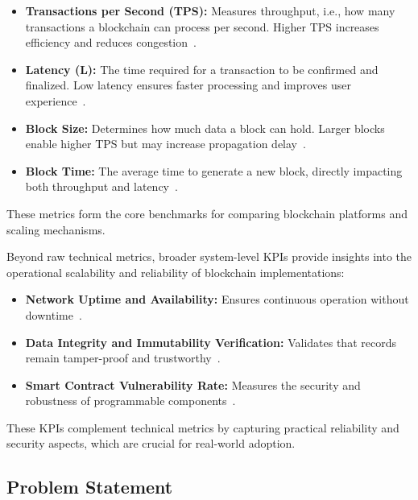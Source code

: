\begin{itemize}
    \item \textbf{Transactions per Second (TPS):} Measures throughput, i.e., how many transactions a blockchain can process per second. Higher TPS increases efficiency and reduces congestion~\cite{khan2021challenges,lin2024status}.
    \item \textbf{Latency (L):} The time required for a transaction to be confirmed and finalized. Low latency ensures faster processing and improves user experience~\cite{buterin2014ethereum,ledger2023tps}.
    \item \textbf{Block Size:} Determines how much data a block can hold. Larger blocks enable higher TPS but may increase propagation delay~\cite{buterin2014ethereum}.
    \item \textbf{Block Time:} The average time to generate a new block, directly impacting both throughput and latency~\cite{khan2021challenges}.
\end{itemize}

These metrics form the core benchmarks for comparing blockchain platforms and scaling mechanisms.

\vspace{12pt}
\vspace{12pt}

Beyond raw technical metrics, broader system-level KPIs provide insights into the operational scalability and reliability of blockchain implementations:

\begin{itemize}
    \item \textbf{Network Uptime and Availability:} Ensures continuous operation without downtime~\cite{slogix2025scalability}.
    \item \textbf{Data Integrity and Immutability Verification:} Validates that records remain tamper-proof and trustworthy~\cite{slogix2025scalability}.
    \item \textbf{Smart Contract Vulnerability Rate:} Measures the security and robustness of programmable components~\cite{slogix2025scalability}.
\end{itemize}

These KPIs complement technical metrics by capturing practical reliability and security aspects, which are crucial for real-world adoption.


\vspace{12pt}
\subsection{Problem Statement}
\vspace{12pt}


